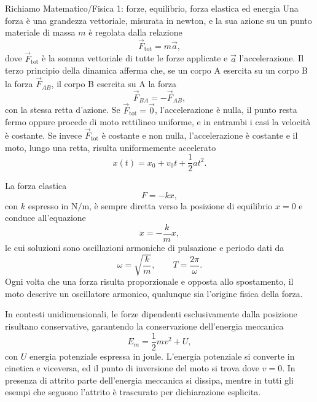 \documentclass[11pt,a4paper]{article}
\newcommand{\Fv}{\vec{F}}
\begin{document}
\begin{richiamo}{Richiamo Matematico/Fisica 1: forze, equilibrio, forza elastica ed energia}
Una forza è una grandezza vettoriale, misurata in newton, e la sua azione su un punto materiale di massa $m$ è regolata dalla relazione
\[
\Fv_{\mathrm{tot}}=m\vec a,
\]
dove $\Fv_{\mathrm{tot}}$ è la somma vettoriale di tutte le forze applicate e $\vec a$ l'accelerazione. Il terzo principio della dinamica afferma che, se un corpo A esercita su un corpo B la forza $\Fv_{AB}$, il corpo B esercita su A la forza
\[
\Fv_{BA}=-\Fv_{AB},
\]
con la stessa retta d'azione. Se $\Fv_{\mathrm{tot}}=\vec 0$, l'accelerazione è nulla, il punto resta fermo oppure procede di moto rettilineo uniforme, e in entrambi i casi la velocità è costante. Se invece $\Fv_{\mathrm{tot}}$ è costante e non nulla, l'accelerazione è costante e il moto, lungo una retta, risulta uniformemente accelerato
\[
x(t)=x_0+v_0t+\frac{1}{2}a t^2.
\]

La forza elastica
\[
F = -kx,
\]
con $k$ espresso in $\mathrm{N/m}$, è sempre diretta verso la posizione di equilibrio $x = 0$ e conduce all'equazione
\[
\ddot{x} = -\frac{k}{m}x,
\]
le cui soluzioni sono oscillazioni armoniche di pulsazione e periodo dati da
\[
\omega = \sqrt{\frac{k}{m}}, \qquad T = \frac{2\pi}{\omega}.
\]
Ogni volta che una forza risulta proporzionale e opposta allo spostamento, il moto descrive un oscillatore armonico, qualunque sia l'origine fisica della forza.

In contesti unidimensionali, le forze dipendenti esclusivamente dalla posizione risultano conservative, garantendo la conservazione dell'energia meccanica
\[
E_m = \frac{1}{2}mv^2 + U,
\]
con $U$ energia potenziale espressa in joule. L'energia potenziale si converte in cinetica e viceversa, ed il punto di inversione del moto si trova dove $v = 0$. In presenza di attrito parte dell'energia meccanica si dissipa, mentre in tutti gli esempi che seguono l'attrito è trascurato per dichiarazione esplicita.
\end{richiamo}
\end{document}
